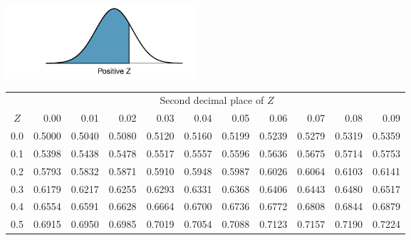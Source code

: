 \begin{table}[p]
\begin{center}{\small
\includegraphics[width=71mm]{extraTeX/tables/figures/normalTails/normalTailRight} \vspace{2mm} \\
\begin{tabular}{c | rrrrr | rrrrr |}
  \cline{2-11}
&&&& \multicolumn{4}{c}{Second decimal place of $Z$} &&& \\
  \cline{2-11}
$Z$ & 0.00 & 0.01 & 0.02 & 0.03 & 0.04 & 0.05 & 0.06 & 0.07 & 0.08 & 0.09 \\
  \hline
  \hline
0.0 & \footnotesize{0.5000} & \footnotesize{0.5040} & \footnotesize{0.5080} & \footnotesize{0.5120} & \footnotesize{0.5160} & \footnotesize{0.5199} & \footnotesize{0.5239} & \footnotesize{0.5279} & \footnotesize{0.5319} & \footnotesize{0.5359} \\
  0.1 & \footnotesize{0.5398} & \footnotesize{0.5438} & \footnotesize{0.5478} & \footnotesize{0.5517} & \footnotesize{0.5557} & \footnotesize{0.5596} & \footnotesize{0.5636} & \footnotesize{0.5675} & \footnotesize{0.5714} & \footnotesize{0.5753} \\
  0.2 & \footnotesize{0.5793} & \footnotesize{0.5832} & \footnotesize{0.5871} & \footnotesize{0.5910} & \footnotesize{0.5948} & \footnotesize{0.5987} & \footnotesize{0.6026} & \footnotesize{0.6064} & \footnotesize{0.6103} & \footnotesize{0.6141} \\
  0.3 & \footnotesize{0.6179} & \footnotesize{0.6217} & \footnotesize{0.6255} & \footnotesize{0.6293} & \footnotesize{0.6331} & \footnotesize{0.6368} & \footnotesize{0.6406} & \footnotesize{0.6443} & \footnotesize{0.6480} & \footnotesize{0.6517} \\
  0.4 & \footnotesize{0.6554} & \footnotesize{0.6591} & \footnotesize{0.6628} & \footnotesize{0.6664} & \footnotesize{0.6700} & \footnotesize{0.6736} & \footnotesize{0.6772} & \footnotesize{0.6808} & \footnotesize{0.6844} & \footnotesize{0.6879} \\
  \hline
  0.5 & \footnotesize{0.6915} & \footnotesize{0.6950} & \footnotesize{0.6985} & \footnotesize{0.7019} & \footnotesize{0.7054} & \footnotesize{0.7088} & \footnotesize{0.7123} & \footnotesize{0.7157} & \footnotesize{0.7190} & \footnotesize{0.7224} \\

\end{tabular}}
\end{center}
\end{table}
